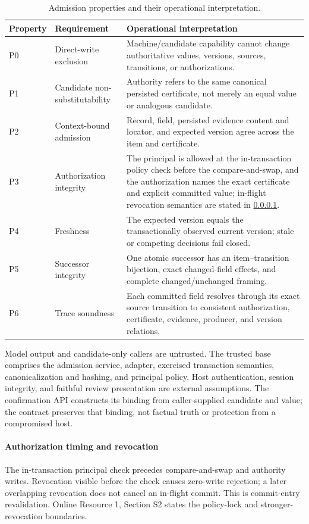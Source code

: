 \begin{table}[t]
\centering
\caption{Admission properties and their operational interpretation.}
\label{tab:properties}
\begin{tabularx}{\textwidth}{@{}l>{\raggedright\arraybackslash}p{}>{\raggedright\arraybackslash}X@{}}
\toprule
Property & Requirement & Operational interpretation \\
\midrule
P0 & Direct-write exclusion & Machine/candidate capability cannot change authoritative values, versions, sources, transitions, or authorizations. \\
P1 & Candidate non-substitutability & Authority refers to the same canonical persisted certificate, not merely an equal value or analogous candidate. \\
P2 & Context-bound admission & Record, field, persisted evidence content and locator, and expected version agree across the item and certificate. \\
P3 & Authorization integrity & The principal is allowed at the in-transaction policy check before the compare-and-swap, and the authorization names the exact certificate and explicit committed value; in-flight revocation semantics are stated in \cref{sec:authorization-timing}. \\
P4 & Freshness & The expected version equals the transactionally observed current version; stale or competing decisions fail closed. \\
P5 & Successor integrity & One atomic successor has an item--transition bijection, exact changed-field effects, and complete changed/unchanged framing. \\
P6 & Trace soundness & Each committed field resolves through its exact source transition to consistent authorization, certificate, evidence, producer, and version relations. \\
\bottomrule
\end{tabularx}
\end{table}


Model output and candidate-only callers are untrusted. The trusted base comprises the admission service, adapter, exercised transaction semantics, canonicalization and hashing, and principal policy. Host authentication, session integrity, and faithful review presentation are external assumptions. The confirmation API constructs its binding from caller-supplied candidate and value; the contract preserves that binding, not factual truth or protection from a compromised host.

\paragraph{Authorization timing and revocation}
\label{sec:authorization-timing}
The in-transaction principal check precedes compare-and-swap and authority writes. Revocation visible before the check causes zero-write rejection; a later overlapping revocation does not cancel an in-flight commit. This is commit-entry revalidation. Online Resource 1, Section S2 states the policy-lock and stronger-revocation boundaries.
